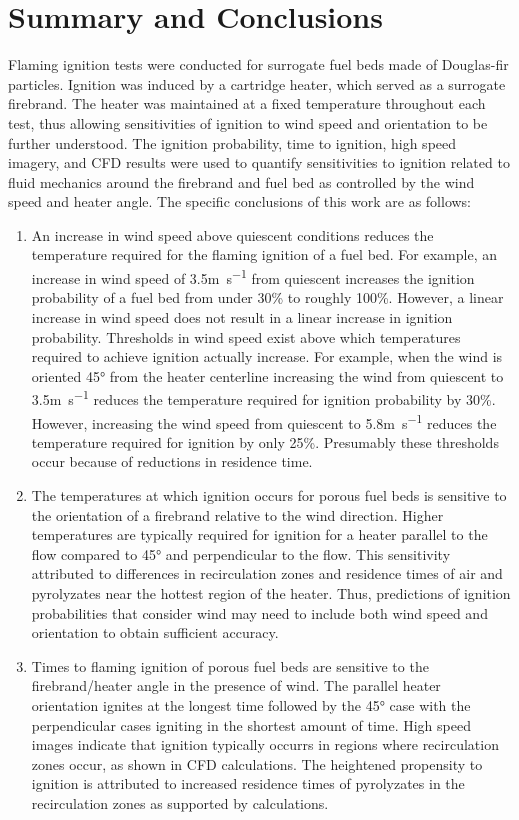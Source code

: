 \section{Summary and Conclusions}
    Flaming ignition tests were conducted for surrogate fuel beds made of Douglas-fir particles.
    Ignition was induced by a cartridge heater, which served as a surrogate firebrand. The heater was maintained at a fixed temperature throughout each test, thus allowing sensitivities of ignition to wind speed and orientation to be further understood. The ignition probability, time to ignition, high speed imagery, and CFD results were used to quantify sensitivities to ignition related to fluid mechanics around the firebrand and fuel bed as controlled by the wind speed and heater angle. The specific conclusions of this work are as follows:
        \begin{enumerate}
            \item
            An increase in wind speed above quiescent conditions reduces the temperature required for the flaming ignition of a fuel bed. For example, an increase in wind speed of 3.5\si{\meter\per\second} from quiescent increases the ignition probability of a fuel bed from under 30\% to roughly 100\%. However, a linear increase in wind speed does not result in a linear increase in ignition probability. Thresholds in wind speed exist above which temperatures required to achieve ignition actually increase. For example, when the wind is oriented 45\si{\degree} from the heater centerline increasing the wind from quiescent to 3.5\si{\meter\per\second} reduces the temperature required for ignition probability by 30\%. However, increasing the wind speed from quiescent to 5.8\si{\meter\per\second} reduces the temperature required for ignition by only 25\%. Presumably these thresholds occur because of reductions in residence time. 
            
            \item The temperatures at which ignition occurs for porous fuel beds is sensitive to the orientation of a firebrand relative to the wind direction. Higher temperatures are typically required for ignition for a heater parallel to the flow compared to 45\si{\degree} and perpendicular to the flow. This sensitivity attributed to differences in recirculation zones and residence times of air and pyrolyzates near the hottest region of the heater. Thus, predictions of ignition probabilities that consider wind may need to include both wind speed and orientation to obtain sufficient accuracy.
            
            \item Times to flaming ignition of porous fuel beds are sensitive to the firebrand/heater angle in the presence of wind.
            The parallel heater orientation ignites at the longest time followed by the 45\si{\degree} case with the perpendicular cases igniting in the shortest amount of time. High speed images indicate that ignition typically occurrs in regions where recirculation zones occur, as shown in CFD calculations. The heightened propensity to ignition is attributed to increased residence times of pyrolyzates in the recirculation zones as supported by calculations.
        \end{enumerate}
